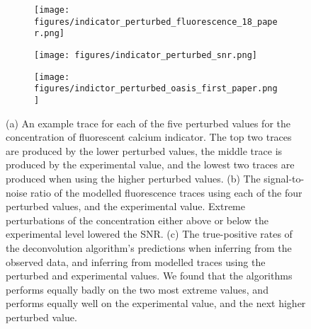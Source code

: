 \documentclass[a4paper,12pt]{article}
\theoremstyle{definition}
\begin{document}
\begin{figure}[p]
    \centering
    \begin{subfigure}{0.9\textwidth}
        \texttt{[image: figures/indicator\_perturbed\_fluorescence\_18\_paper.png]}
        \caption{}
        \label{fig:indicator_perturbed_fluorescence}
    \end{subfigure}
    \newline
    \begin{subfigure}{0.45\textwidth}
        \texttt{[image: figures/indicator\_perturbed\_snr.png]}
        \caption{}
        \label{fig:indicator_perturbed_snr}
    \end{subfigure}
    \begin{subfigure}{0.45\textwidth}
        \texttt{[image: figures/indictor\_perturbed\_oasis\_first\_paper.png]}
        \caption{}
        \label{fig:indicator_perturbed_inference}
    \end{subfigure}
    \caption{(a) An example trace for each of the five perturbed values for the concentration of fluorescent calcium indicator. The top two traces are produced by the lower perturbed values, the middle trace is produced by the experimental value, and the lowest two traces are produced when using the higher perturbed values. (b) The signal-to-noise ratio of the modelled fluorescence traces using each of the four perturbed values, and the experimental value. Extreme perturbations of the concentration either above or below the experimental level lowered the SNR. (c) The true-positive rates of the deconvolution algorithm's predictions when inferring from the observed data, and inferring from modelled traces using the perturbed and experimental values. We found that the algorithms performs equally badly on the two most extreme values, and performs equally well on the experimental value, and the next higher perturbed value.}
    \label{fig:indicator_perturbed}
\end{figure}
\end{document}
